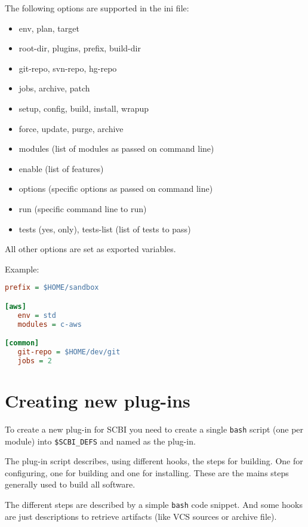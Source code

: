 \documentclass[a4paper,12pt,twoside]{article}
\newcommand{\code}[1]{\texttt{#1}}
\let\stdsection\section
\renewcommand\section{\newpage\stdsection}
\begin{document}
The following options are supported in the ini file:

\begin{itemize}
	\item env, plan, target
	\item root-dir, plugins, prefix, build-dir
	\item git-repo, svn-repo, hg-repo
	\item jobs, archive, patch
	\item setup, config, build, install, wrapup
	\item force, update, purge, archive
	\item modules (list of modules as passed on command line)
	\item enable (list of features)
	\item options (specific options as passed on command line)
	\item run (specific command line to run)
	\item tests (yes, only), tests-list (list of tests to pass)
\end{itemize}

All other options are set as exported variables.

Example:

\begin{lstlisting}[language={Ini}]
prefix = $HOME/sandbox

[aws]
   env = std
   modules = c-aws

[common]
   git-repo = $HOME/dev/git
   jobs = 2
\end{lstlisting}


\section{Creating new plug-ins}

To create a new plug-in for SCBI you need to create a single \code{bash} script (one per module) into \code{\$SCBI\_DEFS} and named as the plug-in.

The plug-in script describes, using different hooks, the steps for building. One for configuring, one for building and one for installing. These are the mains steps generally used to build all software.

The different steps are described by a simple \code{bash} code snippet. And some hooks are just descriptions to retrieve artifacts (like VCS sources or archive file).
\end{document}
